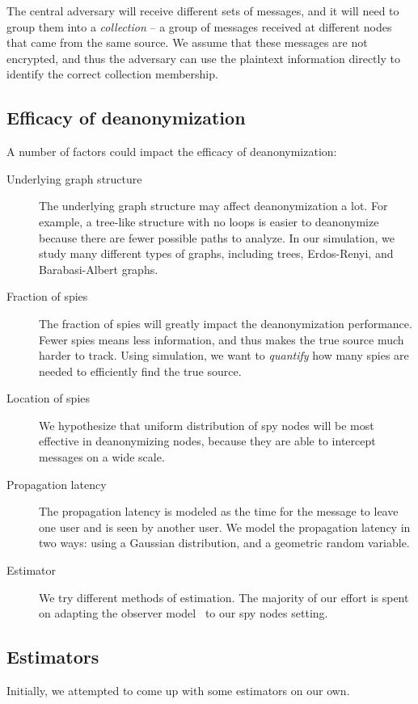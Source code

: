 The central adversary will receive different sets of messages, and it will need to group them into a \emph{collection} -- a group of messages received at different nodes that came from the same source. We assume that these messages are not encrypted, and thus the adversary can use the plaintext information directly to identify the correct collection membership. 

\subsection{Efficacy of deanonymization}

A number of factors could impact the efficacy of deanonymization:

\begin{description}
\item[Underlying graph structure] The underlying graph structure may affect deanonymization a lot. For example, a tree-like structure with no loops is easier to deanonymize because there are fewer possible paths to analyze. In our simulation, we study many different types of graphs, including trees, Erdos-Renyi, and Barabasi-Albert graphs.
\item[Fraction of spies] The fraction of spies will greatly impact the deanonymization performance. Fewer spies means less information, and thus makes the true source much harder to track. Using simulation, we want to \emph{quantify} how many spies are needed to efficiently find the true source.
\item[Location of spies] We hypothesize that uniform distribution of spy nodes will be most effective in deanonymizing nodes, because they are able to intercept messages on a wide scale. 
\item[Propagation latency] The propagation latency is modeled as the time for the message to leave one user and is seen by another user. 
We model the propagation latency in two ways: using a Gaussian distribution, and a geometric random variable. 
\item[Estimator] We try different methods of estimation. The majority of our effort is spent on adapting the observer model~\cite{pinto} to our spy nodes setting.
\end{description}

\subsection{Estimators}
Initially, we attempted to come up with some estimators on our own. 

